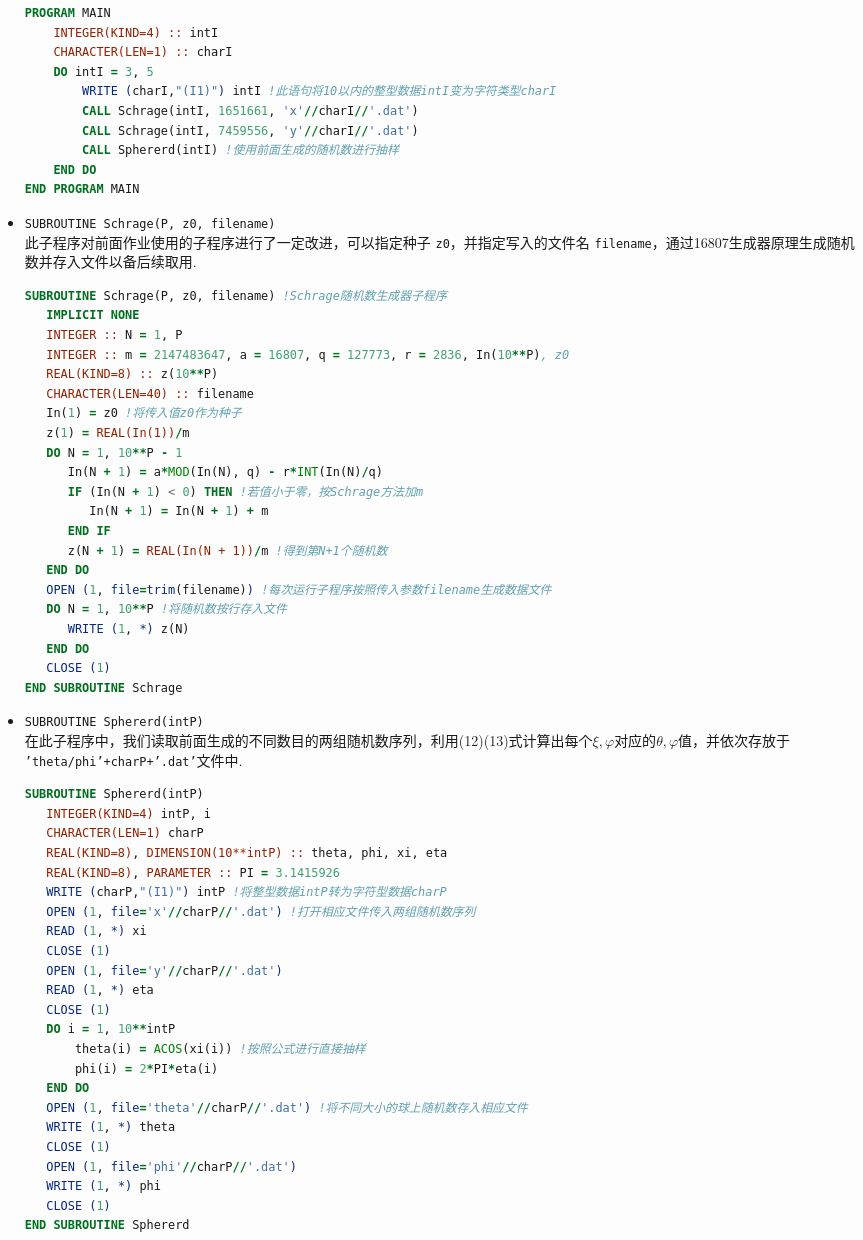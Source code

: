 \documentclass[12pt,a4paper,utf8]{ctexart}
\begin{document}
\begin{itemize}
\begin{framed}
\begin{lstlisting}[language=Fortran]
PROGRAM MAIN
    INTEGER(KIND=4) :: intI
    CHARACTER(LEN=1) :: charI
    DO intI = 3, 5
        WRITE (charI,"(I1)") intI !此语句将10以内的整型数据intI变为字符类型charI
        CALL Schrage(intI, 1651661, 'x'//charI//'.dat')
        CALL Schrage(intI, 7459556, 'y'//charI//'.dat')
        CALL Sphererd(intI) !使用前面生成的随机数进行抽样
    END DO   
END PROGRAM MAIN
\end{lstlisting}
\end{framed}
    \item \texttt{SUBROUTINE Schrage(P, z0, filename)}\\
        此子程序对前面作业使用的子程序进行了一定改进，可以指定种子
        \texttt{z0}，并指定写入的文件名
        \texttt{filename}，通过16807生成器原理生成随机数并存入文件以备后续取用.
\begin{framed}
\begin{lstlisting}[language=Fortran]
SUBROUTINE Schrage(P, z0, filename) !Schrage随机数生成器子程序
   IMPLICIT NONE
   INTEGER :: N = 1, P
   INTEGER :: m = 2147483647, a = 16807, q = 127773, r = 2836, In(10**P), z0
   REAL(KIND=8) :: z(10**P)
   CHARACTER(LEN=40) :: filename
   In(1) = z0 !将传入值z0作为种子
   z(1) = REAL(In(1))/m
   DO N = 1, 10**P - 1
      In(N + 1) = a*MOD(In(N), q) - r*INT(In(N)/q)
      IF (In(N + 1) < 0) THEN !若值小于零，按Schrage方法加m
         In(N + 1) = In(N + 1) + m
      END IF
      z(N + 1) = REAL(In(N + 1))/m !得到第N+1个随机数
   END DO
   OPEN (1, file=trim(filename)) !每次运行子程序按照传入参数filename生成数据文件
   DO N = 1, 10**P !将随机数按行存入文件
      WRITE (1, *) z(N)
   END DO
   CLOSE (1)
END SUBROUTINE Schrage
\end{lstlisting}
\end{framed}
\item \texttt{SUBROUTINE Sphererd(intP)}\\
    在此子程序中，我们读取前面生成的不同数目的两组随机数序列，利用(12)(13)式计算出每个$\xi,\varphi$对应的$\theta,
    \varphi$值，并依次存放于 \texttt{'theta/phi'+charP+'.dat'}文件中.
\begin{framed}
\begin{lstlisting}[language=Fortran]
SUBROUTINE Sphererd(intP)
   INTEGER(KIND=4) intP, i
   CHARACTER(LEN=1) charP
   REAL(KIND=8), DIMENSION(10**intP) :: theta, phi, xi, eta
   REAL(KIND=8), PARAMETER :: PI = 3.1415926
   WRITE (charP,"(I1)") intP !将整型数据intP转为字符型数据charP
   OPEN (1, file='x'//charP//'.dat') !打开相应文件传入两组随机数序列
   READ (1, *) xi
   CLOSE (1)
   OPEN (1, file='y'//charP//'.dat')
   READ (1, *) eta
   CLOSE (1)
   DO i = 1, 10**intP
       theta(i) = ACOS(xi(i)) !按照公式进行直接抽样
       phi(i) = 2*PI*eta(i)
   END DO
   OPEN (1, file='theta'//charP//'.dat') !将不同大小的球上随机数存入相应文件
   WRITE (1, *) theta
   CLOSE (1)
   OPEN (1, file='phi'//charP//'.dat')
   WRITE (1, *) phi
   CLOSE (1)
END SUBROUTINE Sphererd
\end{lstlisting}
\end{framed}


\end{itemize}
\end{document}
